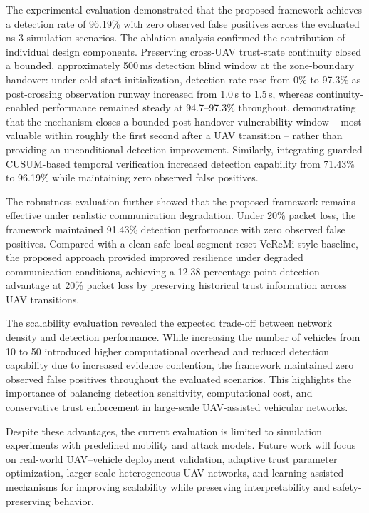 \documentclass[journal]{IEEEtran}
\begin{document}
The experimental evaluation demonstrated that the proposed
framework achieves a detection rate of 96.19\% with zero observed
false positives across the evaluated ns-3 simulation scenarios.
The ablation analysis confirmed the contribution of individual design
components. Preserving cross-UAV trust-state continuity closed a bounded,
approximately 500\,ms detection blind window at the zone-boundary
handover: under cold-start initialization, detection rate rose from 0\%
to 97.3\% as post-crossing observation runway increased from 1.0\,s to
1.5\,s, whereas continuity-enabled performance remained steady at
94.7--97.3\% throughout, demonstrating that the mechanism closes a
bounded post-handover vulnerability window -- most valuable within
roughly the first second after a UAV transition -- rather than providing
an unconditional detection improvement. Similarly, integrating guarded CUSUM-based temporal
verification increased detection capability from 71.43\% to 96.19\% while
maintaining zero observed false positives.

The robustness evaluation further showed that the proposed framework remains
effective under realistic communication degradation. Under 20\% packet loss,
the framework maintained 91.43\% detection performance with zero observed
false positives. Compared with a clean-safe local segment-reset VeReMi-style
baseline, the proposed approach provided improved resilience under degraded
communication conditions, achieving a 12.38 percentage-point detection
advantage at 20\% packet loss by preserving historical trust information
across UAV transitions.

The scalability evaluation revealed the expected trade-off between network
density and detection performance. While increasing the number of vehicles
from 10 to 50 introduced higher computational overhead and reduced detection
capability due to increased evidence contention, the framework maintained
zero observed false positives throughout the evaluated scenarios. This
highlights the importance of balancing detection sensitivity, computational
cost, and conservative trust enforcement in large-scale UAV-assisted
vehicular networks.

Despite these advantages, the current evaluation is limited to simulation
experiments with predefined mobility and attack models. Future work will
focus on real-world UAV--vehicle deployment validation, adaptive trust
parameter optimization, larger-scale heterogeneous UAV networks, and
learning-assisted mechanisms for improving scalability while preserving
interpretability and safety-preserving behavior.
\end{document}
